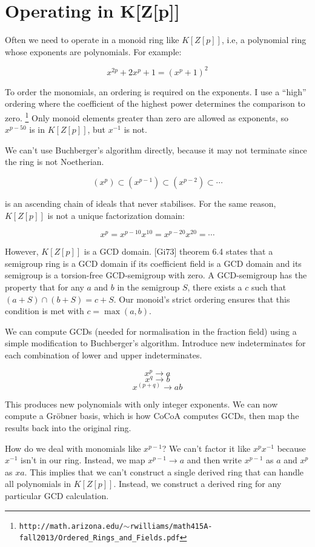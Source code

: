 \documentclass{article}
\begin{document}
\vfill\eject
\section*{Operating in K[Z[p]]}

Often we need to operate in a monoid ring like $K[Z[p]]$, i.e, a
polynomial ring whose exponents are polynomials.  For example:

$$x^{2p}+2x^p+1=(x^p+1)^2$$

To order the monomials, an ordering is required on the exponents.  I use a ``high''
ordering where the coefficient of the highest power determines the comparison to zero.
\footnote{\tt http://math.arizona.edu/$\sim$rwilliams/math415A-fall2013/Ordered\_Rings\_and\_Fields.pdf}
Only monoid elements greater than zero are allowed as exponents, so $x^{p-50}$ is
in $K[Z[p]]$, but $x^{-1}$ is not.

We can't use Buchberger's algorithm directly, because it may not terminate since
the ring is not Noetherian.

$$(x^p) \subset (x^{p-1}) \subset (x^{p-2}) \subset \cdots$$

is an ascending chain of ideals that never stabilises.
For the same reason, $K[Z[p]]$ is not a unique factorization domain:

$$x^p = x^{p-10}x^{10} = x^{p-20}x^{20} = \cdots$$

However, $K[Z[p]]$ is a GCD domain.  [Gi73] theorem 6.4 states that a semigroup
ring is a GCD domain if its coefficient field is a GCD domain and its semigroup
is a torsion-free GCD-semigroup with zero.  A GCD-semigroup has the property
that for any $a$ and $b$ in the semigroup $S$, there exists a $c$ such that
$(a + S) \cap (b + S) = c + S$.  Our monoid's strict ordering ensures that
this condition is met with $c = \max(a,b)$.

We can compute GCDs (needed for normalisation in the fraction field) using a
simple modification to Buchberger's algorithm.  Introduce new indeterminates
for each combination of lower and upper indeterminates.

$$x^p  \to  a$$
$$x^q  \to  b$$
$$x^{(p+q)} \to ab$$

This produces new polynomials with only integer exponents.  We can now
compute a Gr\"obner basis, which is how CoCoA computes GCDs, then map
the results back into the original ring.

How do we deal with monomials like $x^{p-1}$?  We can't factor it like
$x^px^{-1}$ because $x^{-1}$ isn't in our ring.  Instead, we map
$x^{p-1} \to a$ and then write $x^{p-1}$ as $a$ and $x^p$ as $xa$.
This implies that we can't construct a single derived ring that can
handle all polynomials in $K[Z[p]]$.  Instead, we construct a
derived ring for any particular GCD calculation.
\end{document}
